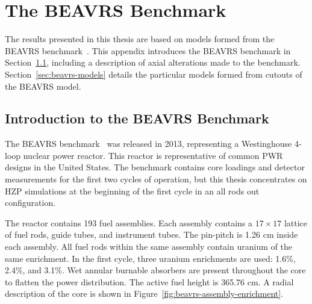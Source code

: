 \chapter{The BEAVRS Benchmark}
\label{app:beavrs}

The results presented in this thesis are based on models formed from the BEAVRS benchmark~\cite{horelik2013beavrs}. This appendix introduces the BEAVRS benchmark in Section~\ref{sec:beavrs-intro}, including a description of axial alterations made to the benchmark. Section~\ref{sec:beavrs-models} details the particular models formed from cutouts of the BEAVRS model.

\section{Introduction to the BEAVRS Benchmark}
\label{sec:beavrs-intro}

The BEAVRS benchmark~\cite{horelik2013beavrs} was released in 2013, representing a Westinghouse 4-loop nuclear power reactor. This reactor is representative of common \ac{PWR} designs in the United States. The benchmark contains core loadings and detector measurements for the first two cycles of operation, but this thesis concentrates on \ac{HZP} simulations at the beginning of the first cycle in an all rods out configuration.

The reactor contains 193 fuel assemblies. Each assembly contains a $17 \times 17$ lattice of fuel rods, guide tubes, and instrument tubes. The pin-pitch is 1.26 cm inside each assembly. All fuel rods within the same assembly contain uranium of the same enrichment. In the first cycle, three uranium enrichments are used: 1.6\%, 2.4\%, and 3.1\%. Wet annular burnable absorbers are present throughout the core to flatten the power distribution. The active fuel height is 365.76 cm. A radial description of the core is shown in Figure~\ref{fig:beavrs-assembly-enrichment}.


